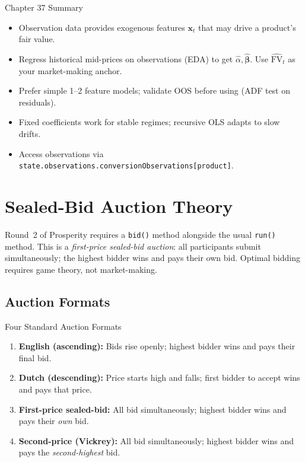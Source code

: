 \documentclass[12pt,a4paper,openany]{report}
\theoremstyle{definition}
\begin{document}
\begin{takeawaybox}{Chapter 37 Summary}
\begin{itemize}
  \item Observation data provides exogenous features $\mathbf{x}_t$ that may drive a product's fair value.
  \item Regress historical mid-prices on observations (EDA) to get $\hat{\alpha}, \hat{\boldsymbol{\beta}}$. Use $\widehat{\text{FV}}_t$ as your market-making anchor.
  \item Prefer simple 1–2 feature models; validate OOS before using (ADF test on residuals).
  \item Fixed coefficients work for stable regimes; recursive OLS adapts to slow drifts.
  \item Access observations via \texttt{state.observations.conversionObservations[product]}.
\end{itemize}
\end{takeawaybox}


\chapter{Sealed-Bid Auction Theory}

Round~2 of Prosperity requires a \texttt{bid()} method alongside the usual \texttt{run()} method. This is a \emph{first-price sealed-bid auction}: all participants submit simultaneously; the highest bidder wins and pays their own bid. Optimal bidding requires game theory, not market-making.

\section{Auction Formats}

\begin{definitionbox}{Four Standard Auction Formats}
\begin{enumerate}[label=\arabic*.]
  \item \textbf{English (ascending):} Bids rise openly; highest bidder wins and pays their final bid.
  \item \textbf{Dutch (descending):} Price starts high and falls; first bidder to accept wins and pays that price.
  \item \textbf{First-price sealed-bid:} All bid simultaneously; highest bidder wins and pays their \emph{own} bid.
  \item \textbf{Second-price (Vickrey):} All bid simultaneously; highest bidder wins and pays the \emph{second-highest} bid.
\end{enumerate}
\end{definitionbox}
\end{document}
